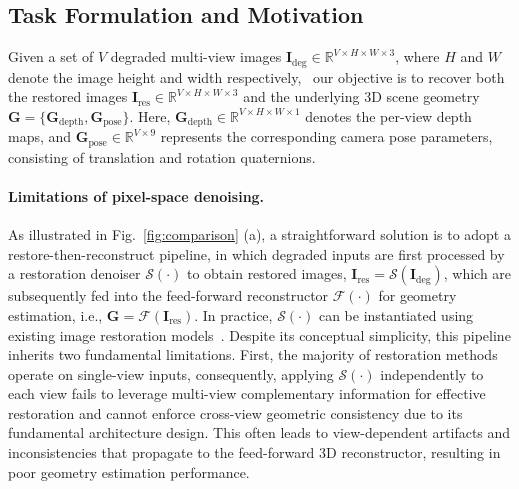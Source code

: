 

\subsection{Task Formulation and Motivation}

Given a set of $V$ degraded multi-view images $\mathbf{I}_{\text{deg}} \in \mathbb{R}^{V \times H \times W \times 3}$, where $H$ and $W$ denote the image height and width respectively, \ our objective is to recover both the restored images $\mathbf{I}_{\text{res}} \in \mathbb{R}^{V \times H \times W \times 3}$ and the underlying 3D scene geometry $\mathbf{G} = \{\mathbf{G}_\text{depth}, \mathbf{G}_\text{pose}\}$. Here, $\mathbf{G}_\text{depth} \in \mathbb{R}^{V \times H \times W \times 1}$ denotes the per-view depth maps, and $\mathbf{G}_\text{pose} \in \mathbb{R}^{V \times 9}$ represents the corresponding camera pose parameters, consisting of translation and rotation quaternions.



\paragraph{Limitations of pixel-space denoising.}
As illustrated in Fig.~\ref{fig:comparison} (a), a straightforward solution is to adopt a {restore-then-reconstruct} pipeline, in which degraded inputs are first processed by a restoration denoiser $\mathcal{S}(\cdot)$ to obtain restored images, $\mathbf{I}_{\text{res}} = \mathcal{S}(\mathbf{I}_{\text{deg}})$, which are subsequently fed into the feed-forward reconstructor $\mathcal{F}(\cdot)$ for geometry estimation, i.e., $\mathbf{G} = \mathcal{F}(\mathbf{I}_{\text{res}})$. In practice, $\mathcal{S}(\cdot)$ can be instantiated using existing image restoration models~\cite{zamir2022restormer, chen2023hierarchical, conde2024high, zamfir2024complexityexperts, liang2024vrt, Youk_2024_CVPR}. Despite its conceptual simplicity, this pipeline inherits two fundamental limitations. First, the majority of restoration methods operate on single-view inputs, consequently, applying $\mathcal{S}(\cdot)$ independently to each view fails to leverage multi-view complementary information for effective restoration and cannot enforce cross-view geometric consistency due to its fundamental architecture design. This often leads to view-dependent artifacts and inconsistencies that propagate to the feed-forward 3D reconstructor, resulting in poor geometry estimation performance. 

